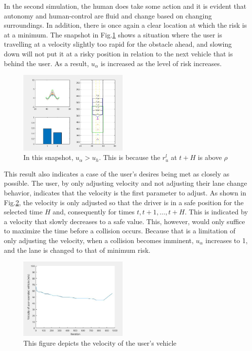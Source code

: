 \documentclass[letterpaper, 10 pt, conference]{ieeeconf}  %
\begin{document}
In the second simulation, the human does take some action and it is evident that autonomy and human-control are fluid and change based on changing surroundings. In addition, there is once again a clear location at which the risk is at a minimum. The snapshot in Fig.\ref{fig:cs2} shows a situation where the user is travelling at a velocity slightly too rapid for the obstacle ahead, and slowing down will not put it at a risky position in relation to the next vehicle that is behind the user. As a result, $u_{\alpha}$ is increased as the level of risk increases.

\begin{figure}[ht]
    \includegraphics[width=0.48\textwidth]{cs2.JPG}
    \caption{In this snapshot, $u_{\alpha} > u_{h}$. This is because the $r^l_u$ at $t+H$ is above $\rho$}
    \label{fig:cs2}
\end{figure}

This result also indicates a case of the user's desires being met as closely as possible. The user, by only adjusting velocity and not adjusting their lane change behavior, indicates that the velocity is the first parameter to adjust. As shown in Fig.\ref{fig:cs2c}, the velocity is only adjusted so that the driver is in a safe position for the selected time $H$ and, consequently for times $t,t+1,\ldots,t+H$. This is indicated by a velocity that slowly decreases to a safe value. This, however, would only suffice to maximize the time before a collision occurs. Because that is a limitation of only adjusting the velocity, when a collision becomes imminent, $u_\alpha$ increases to 1, and the lane is changed to that of minimum risk.

\begin{figure}[ht]
    \includegraphics[width=0.48\textwidth]{cs2c.JPG}
    \caption{This figure depicts the velocity of the user's vehicle}
    \label{fig:cs2c}
\end{figure}
\end{document}
